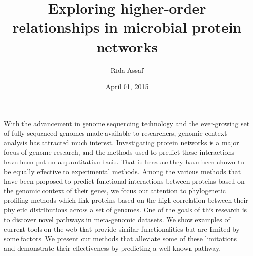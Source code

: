 \documentclass{ucetd}
\title{Exploring higher-order relationships in microbial protein networks}
\author{Rida Assaf}
\date{April 01, 2015}
\begin{document}
\maketitle

\makecopyright
\makededication
\makeepigraph


\tableofcontents
\listoffigures

\acknowledgments

\abstract
With the advancement in genome sequencing technology and the ever-growing set of fully sequenced genomes made available to researchers,  genomic context analysis has attracted much interest. Investigating protein networks is a major focus of genome research, and the methods used to predict these interactions have been put on a quantitative basis. That is because they have been shown to be equally effective to experimental methods. Among the various methods that have been proposed to predict functional interactions between proteins based on the genomic context of their genes, we focus our attention to phylogenetic profiling methods which link proteins based on the high correlation between their phyletic distributions across a set of genomes. One of the goals of this research is to discover novel pathways in meta-genomic datasets. 
We show examples of current tools on the web that provide similar functionalities but are limited by some factors.  We present our methods that alleviate some of these limitations and demonstrate their effectiveness by predicting a well-known pathway. 

\mainmatter
\end{document}
